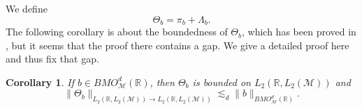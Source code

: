 \documentclass[oneside,english,a4wide]{amsart}
\numberwithin{equation}{section}
\numberwithin{figure}{section}
\theoremstyle{plain}
\theoremstyle{plain}
\newtheorem{corollary}[thm]{Corollary}
\theoremstyle{definition}
\theoremstyle{plain}
\theoremstyle{remark}
\theoremstyle{definition}
\theoremstyle{remark}
\theoremstyle{definition}
\newcommand{\8}{\infty}
\begin{document}
We define
	\begin{equation}\label{Thetab}
	\Theta_b=\pi_b+\varLambda_b.
\end{equation}
 The following corollary is about the boundedness of $\Theta_b$, which has been proved in \cite[Proposition A.2]{HM}, but it seems that the proof there contains a gap. We give a detailed proof here and thus fix that gap.
\begin{corollary}\label{Thetabest}
	If $b\in BMO^d_\mathcal{M}(\mathbb{R})$, then $\Theta_b$ is bounded on $L_2(\mathbb{R},L_2(\mathcal{M}))$ and 
	\begin{equation*}
		\|\Theta_b\|_{L_2(\mathbb{R},L_2(\mathcal{M}))\to L_2(\mathbb{R},L_2(\mathcal{M}))}\lesssim_d \|b\|_{BMO^d_\mathcal{M}(\mathbb{R})}.
	\end{equation*}
\end{corollary}
\end{document}
